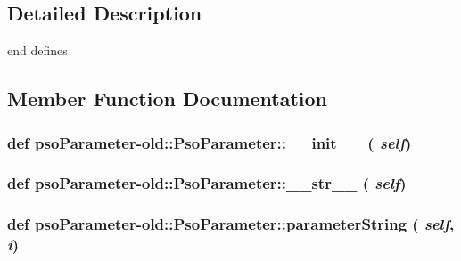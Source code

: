 \subsection{Detailed Description}
end defines 

\subsection{Member Function Documentation}
\hypertarget{classpsoParameter-old_1_1PsoParameter_c125e5705b61324ba3d2b29014251333}{
\subsubsection{\setlength{\rightskip}{0pt plus 5cm}def psoParameter-old::PsoParameter::\_\-\_\-init\_\-\_\- ( {\em self})}}
\label{classpsoParameter-old_1_1PsoParameter_c125e5705b61324ba3d2b29014251333}


\hypertarget{classpsoParameter-old_1_1PsoParameter_4369aff0c3c6bf1981b0b35f69592097}{
\subsubsection{\setlength{\rightskip}{0pt plus 5cm}def psoParameter-old::PsoParameter::\_\-\_\-str\_\-\_\- ( {\em self})}}
\label{classpsoParameter-old_1_1PsoParameter_4369aff0c3c6bf1981b0b35f69592097}


\hypertarget{classpsoParameter-old_1_1PsoParameter_26b87936eff6693f2b8e207ed0990ffc}{
\subsubsection{\setlength{\rightskip}{0pt plus 5cm}def psoParameter-old::PsoParameter::parameterString ( {\em self}, \/   {\em i})}}
\label{classpsoParameter-old_1_1PsoParameter_26b87936eff6693f2b8e207ed0990ffc}


